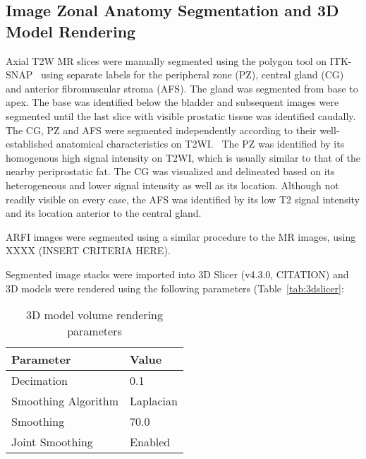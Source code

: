 \subsection{Image Zonal Anatomy Segmentation and 3D Model Rendering}
Axial T2W MR slices were manually segmented using the polygon tool on
ITK-SNAP~\cite{Yushkevich2006} using separate labels for the peripheral zone
(PZ), central gland (CG) and anterior fibromuscular stroma (AFS). The gland was
segmented from base to apex.  The base was identified below the bladder and
subsequent images were segmented until the last slice with visible prostatic
tissue was identified caudally. The CG, PZ and AFS were segmented independently
according to their well-established anatomical characteristics on
T2WI.~\cite{Verma2011,Jung2012,Poon1985,Hricak2007,Bonekamp2011} The PZ was
identified by its homogenous high signal intensity on T2WI, which is usually
similar to that of the nearby periprostatic fat. The CG was visualized and
delineated based on its heterogeneous and lower signal intensity as well as its
location. Although not readily visible on every case, the AFS was identified by
its low T2 signal intensity and its location anterior to the central gland. 

ARFI images were segmented using a similar procedure to the MR images, using
XXXX (INSERT CRITERIA HERE).  

Segmented image stacks were imported into 3D Slicer (v4.3.0, CITATION) and 3D
models were rendered using the following parameters (Table~\ref{tab:3dslicer}:

\begin{table}[htb!]
\centering
\caption{3D model volume rendering parameters}
\begin{tabular}{ll}
{\bf Parameter} & {\bf Value} \\ \hline
Decimation & 0.1 \\
Smoothing Algorithm & Laplacian \\
Smoothing  & 70.0 \\
Joint Smoothing & Enabled \\
\end{tabular}
\end{table}

